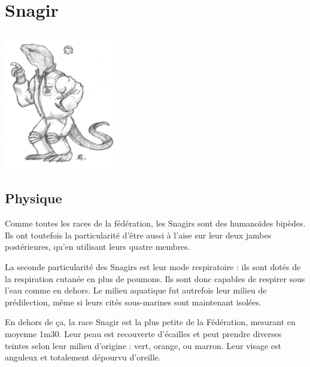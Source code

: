 
\chapter{Snagir}

\begin{multicols}{2}

\begin{center}
	\includegraphics[width=143pt]{Img/snagir}
\end{center}

\section{Physique}

Comme toutes les races de la fédération, les Snagirs sont des humanoïdes bipèdes. Ils ont toutefois la particularité d'être aussi à l'aise sur leur deux jambes postérieures, qu'en utilisant leurs quatre membres.

La seconde particularité des Snagirs est leur mode respiratoire : ils sont dotés de la respiration cutanée en plus de poumons. Ils sont donc capables de respirer sous l'eau comme en dehors. Le milieu aquatique fut autrefois leur milieu de prédilection, même si leurs cités sous-marines sont maintenant isolées.

En dehors de ça, la race Snagir est la plus petite de la Fédération, mesurant en moyenne 1m30. Leur peau est recouverte d'écailles et peut prendre diverses teintes selon leur milieu d'origine : vert, orange, ou marron. Leur visage est anguleux et totalement dépourvu d'oreille. 


\end{multicols}
